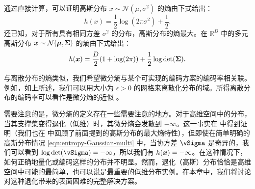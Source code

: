 \documentclass[../../book-main_zh.tex]{subfiles}
\begin{document}
\begin{example}[高斯分布的熵]
	通过直接计算，可以证明高斯分布 $x \sim \mathcal{N}(\mu, \sigma^2)$ 的熵由下式给出：
	\begin{equation}
		h(x) = \frac{1}{2}\log (2\pi \sigma^2) + \frac{1}{2}.
		\label{eqn:entropy-Gaussian}
	\end{equation}
	还已知，对于所有具有相同方差 $\sigma^2$ 的分布，高斯分布的熵最大。在 $\mathbb{R}^D$ 中的多元高斯分布 $\bm{x} \sim \mathcal{N}(\boldsymbol{\mu}, \boldsymbol{\Sigma})$ 的熵由下式给出：
	\begin{equation}
		h(\bm{x}) = \frac{D}{2}(1 + \log(2\pi)) + \frac{1}{2}\log\det(\boldsymbol{\Sigma}).
		\label{eqn:entropy-Gaussian-multi}
	\end{equation}
\end{example}

与离散分布的熵类似，我们希望微分熵与某个可实现的编码方案的编码率相关联。例如，如上所述，我们可以用大小为 $\epsilon >0$ 的网格来离散化分布的域。所得离散分布的编码率可以看作是微分熵的近似 \cite{Cover-Thomas}。


需要注意的是，微分熵的定义存在一些需要注意的地方。对于高维空间中的分布，当其支撑集变得退化（低维）时，其微分熵会发散到 \(-\infty\)。这一事实在  中得到证明（我们也在  中回顾了前面提到的高斯分布的最大熵特性），但即使在简单明确的高斯分布情况 \eqref{eqn:entropy-Gaussian-multi} 中，当协方差 \(\vSigma\) 是奇异的，我们可以看到 \(\log\det(\vSigma) = -\infty\)，所以我们有 $h(\bm{x}) = -\infty$。在这种情况下，如何正确地量化或编码这样的分布并不明显。然而，退化（高斯）分布恰恰是高维空间中可能的最简单，也可以说是最重要的低维分布实例。在本章中，我们将讨论对这种退化带来的表面困难的完整解决方案。


\end{document}
